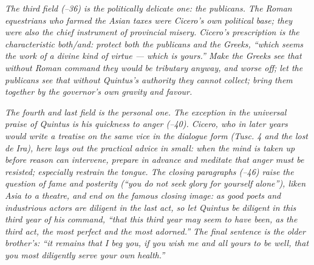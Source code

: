 \textit{The third field (--36) is the
politically delicate one: the publicans. The Roman
equestrians who farmed the Asian taxes were Cicero's own
political base; they were also the chief instrument of
provincial misery. Cicero's prescription is the
characteristic both/and: protect both the publicans and
the Greeks, ``which seems the work of a divine kind of
virtue --- which is yours.'' Make the Greeks see that
without Roman command they would be tributary anyway,
and worse off; let the publicans see that without
Quintus's authority they cannot collect; bring them
together by the governor's own gravity and favour.}

\textit{The fourth and last field is the personal one. The
exception in the universal praise of Quintus is his
quickness to anger (--40). Cicero, who in
later years would write a treatise on the same vice in
the dialogue form (\textit{Tusc.} 4 and the lost
\textit{de Ira}), here lays out the practical advice in
small: when the mind is taken up before reason can
intervene, prepare in advance and meditate that anger
must be resisted; especially restrain the tongue. The
closing paragraphs (--46) raise the
question of fame and posterity (``you do not seek glory
for yourself alone''), liken Asia to a theatre, and end
on the famous closing image: as good poets and
industrious actors are diligent in the last act, so let
Quintus be diligent in this third year of his command,
``that this third year may seem to have been, as the
third act, the most perfect and the most adorned.'' The
final sentence is the older brother's: ``it remains that
I beg you, if you wish me and all yours to be well, that
you most diligently serve your own health.''}
